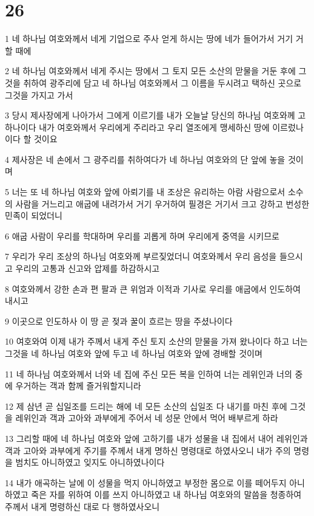 \chapter{26}

\par 1 네 하나님 여호와께서 네게 기업으로 주사 얻게 하시는 땅에 네가 들어가서 거기 거할 때에
\par 2 네 하나님 여호와께서 네게 주시는 땅에서 그 토지 모든 소산의 맏물을 거둔 후에 그것을 취하여 광주리에 담고 네 하나님 여호와께서 그 이름을 두시려고 택하신 곳으로 그것을 가지고 가서
\par 3 당시 제사장에게 나아가서 그에게 이르기를 내가 오늘날 당신의 하나님 여호와께 고하나이다 내가 여호와께서 우리에게 주리라고 우리 열조에게 맹세하신 땅에 이르렀나이다 할 것이요
\par 4 제사장은 네 손에서 그 광주리를 취하여다가 네 하나님 여호와의 단 앞에 놓을 것이며
\par 5 너는 또 네 하나님 여호와 앞에 아뢰기를 내 조상은 유리하는 아람 사람으로서 소수의 사람을 거느리고 애굽에 내려가서 거기 우거하여 필경은 거기서 크고 강하고 번성한 민족이 되었더니
\par 6 애굽 사람이 우리를 학대하며 우리를 괴롭게 하며 우리에게 중역을 시키므로
\par 7 우리가 우리 조상의 하나님 여호와께 부르짖었더니 여호와께서 우리 음성을 들으시고 우리의 고통과 신고와 압제를 하감하시고
\par 8 여호와께서 강한 손과 편 팔과 큰 위엄과 이적과 기사로 우리를 애굽에서 인도하여 내시고
\par 9 이곳으로 인도하사 이 땅 곧 젖과 꿀이 흐르는 땅을 주셨나이다
\par 10 여호와여 이제 내가 주께서 내게 주신 토지 소산의 맏물을 가져 왔나이다 하고 너는 그것을 네 하나님 여호와 앞에 두고 네 하나님 여호와 앞에 경배할 것이며
\par 11 네 하나님 여호와께서 너와 네 집에 주신 모든 복을 인하여 너는 레위인과 너의 중에 우거하는 객과 함께 즐거워할지니라
\par 12 제 삼년 곧 십일조를 드리는 해에 네 모든 소산의 십일조 다 내기를 마친 후에 그것을 레위인과 객과 고아와 과부에게 주어서 네 성문 안에서 먹어 배부르게 하라
\par 13 그리할 때에 네 하나님 여호와 앞에 고하기를 내가 성물을 내 집에서 내어 레위인과 객과 고아와 과부에게 주기를 주께서 내게 명하신 명령대로 하였사오니 내가 주의 명령을 범치도 아니하였고 잊지도 아니하였나이다
\par 14 내가 애곡하는 날에 이 성물을 먹지 아니하였고 부정한 몸으로 이를 떼어두지 아니하였고 죽은 자를 위하여 이를 쓰지 아니하였고 내 하나님 여호와의 말씀을 청종하여 주께서 내게 명령하신 대로 다 행하였사오니
